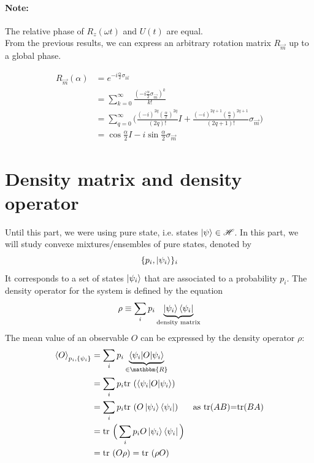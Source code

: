 \documentclass{article}
\begin{document}
\paragraph{Note: }
The relative phase of $R_z(\omega t)$ and $U(t)$ are equal.
\\\noindent
From the previous results, we can express an arbitrary rotation matrix $R_{\vec{m}}$
up to a global phase.

\begin{equation}
    \begin{aligned}
        R_{\vec{m}}(\alpha)
            & = e^{-i\frac{\alpha}{2}\sigma_{\vec{m}}} \\
            & = \sum_{k=0}^\infty
             \frac{(-i \frac{\alpha}{2}\sigma_{\vec{m}})^k}{k!} \\
            & = \sum_{q=0}^\infty \Big(\frac{(-i)^{2q}(\frac{\alpha}{2})^{2q}}{(2q)!}I +
                \frac{(-i)^{2q+1}(\frac{\alpha}{2})^{2q+1}}{(2q+1)!}\sigma_{\vec{m}}\Big) \\
            & = \cos\frac{\alpha}{2}I - i\sin\frac{\alpha}{2}\sigma_{\vec{m}}
    \end{aligned}
\end{equation}

\section{Density matrix and density operator}

Until this part, we were using pure state, i.e. states $\ket{\psi} \in \mathscr{H}$.
In this part, we will study convexe mixtures/ensembles of pure states, denoted by
\begin{equation}
    \{p_i, \ket{\psi_i}\}_i
\end{equation}
It corresponds to a set of states $\ket{\psi_i}$ that are associated to a probability $p_i$.
The density operator for the system is defined by the equation
\begin{equation}
    \label{def-density-matrix}
    \rho \equiv \sum_ip_i\underbrace{\ket{\psi_i}\bra{\psi_i}}_{\text{density matrix}}
\end{equation}
The mean value of an observable $O$ can be expressed by the density operator
$\rho$:
\begin{equation}
    \label{expectation-value-and-trace}
    \begin{aligned}
        \braket{O}_{p_i, \{\psi_i\}}
            & = \sum_i p_i \underbrace{\braket{\psi_i|O|\psi_i}}_{\in \mathbbm{R}} \\
            & = \sum_i p_i \text{tr }(\braket{\psi_i|O|\psi_i}) \\
            & = \sum_i p_i \text{tr }(O\ket{\psi_i}\bra{\psi_i}) & \text{as tr($AB$)=tr($BA$)} \\
            & = \text{tr }\Big(\sum_ip_iO\ket{\psi_i}\bra{\psi_i}\Big) \\
            & = \text{tr }(O\rho) = \text{tr }(\rho O)
    \end{aligned}
\end{equation}
\end{document}
